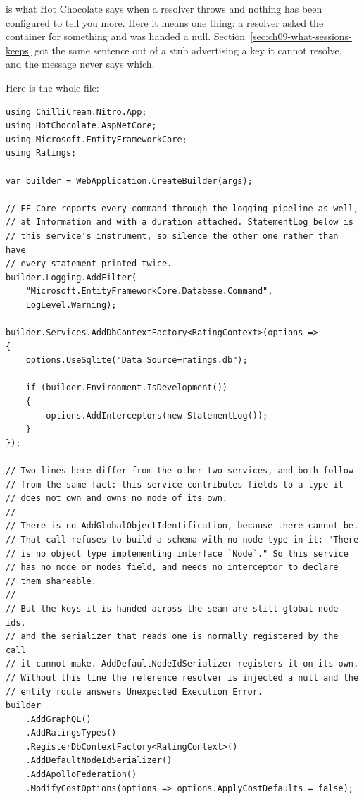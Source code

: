 %
 is what Hot Chocolate says when a resolver
throws and nothing has been configured to tell you more. Here it means one
thing: a resolver asked the container for something and was handed a null.
Section~\ref{sec:ch09-what-sessions-keeps} got the same sentence out of a stub
advertising a key it cannot resolve, and the message never says which.

Here is the whole file:

\begin{verbatim}
using ChilliCream.Nitro.App;
using HotChocolate.AspNetCore;
using Microsoft.EntityFrameworkCore;
using Ratings;

var builder = WebApplication.CreateBuilder(args);

// EF Core reports every command through the logging pipeline as well,
// at Information and with a duration attached. StatementLog below is
// this service's instrument, so silence the other one rather than have
// every statement printed twice.
builder.Logging.AddFilter(
    "Microsoft.EntityFrameworkCore.Database.Command",
    LogLevel.Warning);

builder.Services.AddDbContextFactory<RatingContext>(options =>
{
    options.UseSqlite("Data Source=ratings.db");

    if (builder.Environment.IsDevelopment())
    {
        options.AddInterceptors(new StatementLog());
    }
});

// Two lines here differ from the other two services, and both follow
// from the same fact: this service contributes fields to a type it
// does not own and owns no node of its own.
//
// There is no AddGlobalObjectIdentification, because there cannot be.
// That call refuses to build a schema with no node type in it: "There
// is no object type implementing interface `Node`." So this service
// has no node or nodes field, and needs no interceptor to declare
// them shareable.
//
// But the keys it is handed across the seam are still global node ids,
// and the serializer that reads one is normally registered by the call
// it cannot make. AddDefaultNodeIdSerializer registers it on its own.
// Without this line the reference resolver is injected a null and the
// entity route answers Unexpected Execution Error.
builder
    .AddGraphQL()
    .AddRatingsTypes()
    .RegisterDbContextFactory<RatingContext>()
    .AddDefaultNodeIdSerializer()
    .AddApolloFederation()
    .ModifyCostOptions(options => options.ApplyCostDefaults = false);


\end{verbatim}
